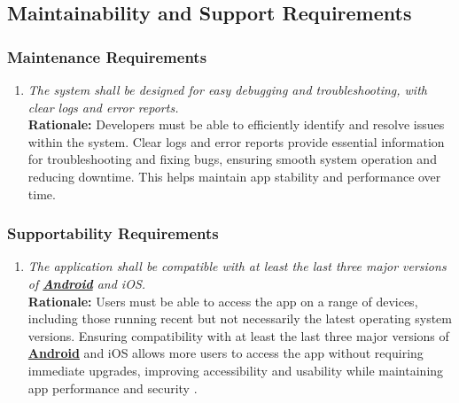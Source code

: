 \documentclass[]{article}
\begin{document}

\subsection{Maintainability and Support Requirements}
\label{sub:maintainability_and_support_requirements}

\subsubsection{Maintenance Requirements}
\label{ssub:maintenance_requirements}
\begin{enumerate}[{MS-M}1. ]
	\item \textit{The system shall be designed for easy debugging and troubleshooting, with clear logs and error reports.}
	\\ \textbf{Rationale:} Developers must be able to efficiently identify and resolve issues within the system. Clear logs and error reports provide essential information for troubleshooting and fixing bugs, ensuring smooth system operation and reducing downtime. This helps maintain app stability and performance over time.
\end{enumerate}

\subsubsection{Supportability Requirements}
\label{ssub:supportability_requirements}
\begin{enumerate}[{MS-S}1. ]
	\item \textit{The application shall be compatible with at least the last three major versions of \hyperref[Android]{\textbf{Android}} and iOS.}
	\\ \textbf{Rationale:} Users must be able to access the app on a range of devices, including those running recent but not necessarily the latest operating system versions. Ensuring compatibility with at least the last three major versions of \hyperref[Android]{\textbf{Android}} and iOS allows more users to access the app without requiring immediate upgrades, improving accessibility and usability while maintaining app performance and security \cite{MobileOSSupportGuidelines}.
\end{enumerate}
\end{document}
